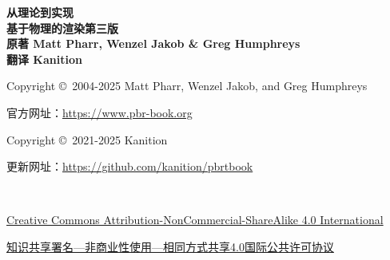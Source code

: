 \noindent \textbf{\LARGE 从理论到实现}\vspace{8pt}\\
\noindent \textbf{\Huge 基于物理的渲染}\qquad\textbf{\large 第三版}\vspace{8pt}\\
\noindent \textbf{\large 原著 \quad Matt Pharr, Wenzel Jakob \& Greg Humphreys}\vspace{5pt}\\
\noindent \textbf{\large 翻译 \quad Kanition}\vspace{12pt}\\


\noindent Copyright \copyright\ 2004-2025 Matt Pharr, Wenzel Jakob, and Greg Humphreys

\noindent 官方网址：\url{https://www.pbr-book.org}\\


\noindent Copyright \copyright\ 2021-2025 Kanition

\noindent 更新网址：\url{https://github.com/kanition/pbrtbook}

\noindent {\ttfamily\small}\\


\noindent \href{https://creativecommons.org/licenses/by-nc-sa/4.0/}
{Creative Commons Attribution-NonCommercial-ShareAlike 4.0 International}

\noindent \href{https://creativecommons.org/licenses/by-nc-sa/4.0/deed.zh-hans}
{知识共享署名—非商业性使用—相同方式共享4.0国际公共许可协议}

\\


